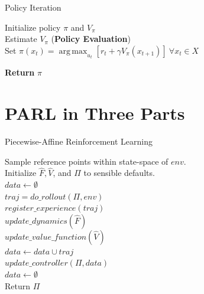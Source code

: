 \documentclass{beamer}
\DeclareMathOperator*{\argmax}{arg\,max}
\begin{document}
\begin{frame}{Policy Iteration}
  \begin{algorithm}[H]
      \DontPrintSemicolon

      Initialize policy $\pi$ and $V_\pi$ \\
       {
        Estimate $V_\pi$ (\textbf{Policy Evaluation}) \\
        Set $\pi(x_t) = \argmax_{u_t} \left[r_t +  \gamma V_\pi(x_{t+1})\right]\ \forall x_t \in X$ \\ 
      }

      \textbf{Return} $\pi$

      \caption{Policy Iteration}
      \label{alg:stability_policy_iteration}
  \end{algorithm}
\end{frame}

\section{PARL in Three Parts}
\begin{frame}{Piecewise-Affine Reinforcement Learning}
  \scalebox{0.7} {
  \begin{algorithm}[H]
    \DontPrintSemicolon
    \SetAlgoLined

    Sample reference points within state-space of $env$. \\
    Initialize $\hat{F}, \hat{V}$, and $\Pi$ to sensible defaults. \\
     {
      $data \leftarrow \emptyset$ \\
       {
        $traj = do\_rollout(\Pi, env)$ \\
        $register\_experience(traj)$ \\
        $update\_dynamics(\hat{F})$ \\
        $update\_value\_function(\hat{V})$ \\
        $data \leftarrow data \cup traj$ \\
      }
      $update\_controller(\Pi, data)$ \\
      $data \leftarrow \emptyset$ \\
    }
    Return $\Pi$
    \caption{PARL}
  \end{algorithm}
  }
\end{frame}
\end{document}
